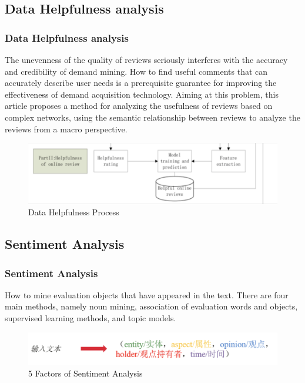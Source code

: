 \documentclass{beamer}
\begin{document}
\subsection{Data Helpfulness analysis}
\begin{frame}
    \frametitle{Data Helpfulness analysis}
    The unevenness of the quality of reviews seriously interferes with the accuracy and credibility of demand mining. How to find useful comments that can accurately describe user needs is a prerequisite guarantee for improving the effectiveness of demand acquisition technology. Aiming at this problem, this article proposes a method for analyzing the usefulness of reviews based on complex networks, using the semantic relationship between reviews to analyze the reviews from a macro perspective.
    \begin{figure}[]
        \centering
        \includegraphics[width=0.6\linewidth]{fig/help}
        \caption{Data Helpfulness Process}
    \end{figure}

\end{frame}

\subsection{Sentiment Analysis}
\begin{frame}
    \frametitle{Sentiment Analysis}
    How to mine evaluation objects that have appeared in the text. There are four main methods, namely noun mining, association of evaluation words and objects, supervised learning methods, and topic models.
    \begin{figure}[]
        \centering
        \includegraphics[width=0.6\linewidth]{fig/sean}
        \caption{5 Factors of Sentiment Analysis}
    \end{figure}
\end{frame}
\end{document}
